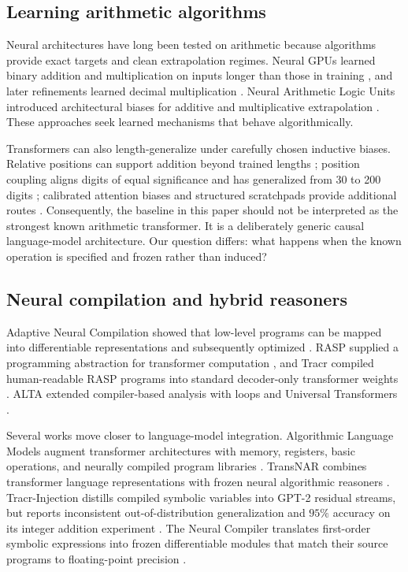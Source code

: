 \documentclass[11pt]{article}
\begin{document}
\subsection{Learning arithmetic algorithms}

Neural architectures have long been tested on arithmetic because algorithms
provide exact targets and clean extrapolation regimes. Neural GPUs learned
binary addition and multiplication on inputs longer than those in training
\cite{kaiser2015neural}, and later refinements learned decimal multiplication
\cite{freivalds2017improving}. Neural Arithmetic Logic Units introduced
architectural biases for additive and multiplicative extrapolation
\cite{trask2018neural}. These approaches seek learned mechanisms that behave
algorithmically.

Transformers can also length-generalize under carefully chosen inductive
biases. Relative positions can support addition beyond trained lengths
\cite{jelassi2023length}; position coupling aligns digits of equal significance
and has generalized from 30 to 200 digits \cite{cho2024position}; calibrated
attention biases and structured scratchpads provide additional routes
\cite{duan2023interpolation,cho2024arithmetic}. Consequently, the baseline in
this paper should not be interpreted as the strongest known arithmetic
transformer. It is a deliberately generic causal language-model architecture.
Our question differs: what happens when the known operation is specified and
frozen rather than induced?

\subsection{Neural compilation and hybrid reasoners}

Adaptive Neural Compilation showed that low-level programs can be mapped into
differentiable representations and subsequently optimized
\cite{bunel2016adaptive}. RASP supplied a programming abstraction for
transformer computation \cite{weiss2021thinking}, and Tracr compiled
human-readable RASP programs into standard decoder-only transformer weights
\cite{lindner2023tracr}. ALTA extended compiler-based analysis with loops and
Universal Transformers \cite{shaw2024alta}.

Several works move closer to language-model integration. Algorithmic Language
Models augment transformer architectures with memory, registers, basic
operations, and neurally compiled program libraries
\cite{saldyt2024algorithmic}. TransNAR combines transformer language
representations with frozen neural algorithmic reasoners
\cite{bounsi2024transformers}. Tracr-Injection distills compiled symbolic
variables into GPT-2 residual streams, but reports inconsistent
out-of-distribution generalization and \(95\%\) accuracy on its integer
addition experiment \cite{vergarabrowne2025tracr}. The Neural Compiler
translates first-order symbolic expressions into frozen differentiable modules
that match their source programs to floating-point precision
\cite{sheneman2026compiler}.
\end{document}
